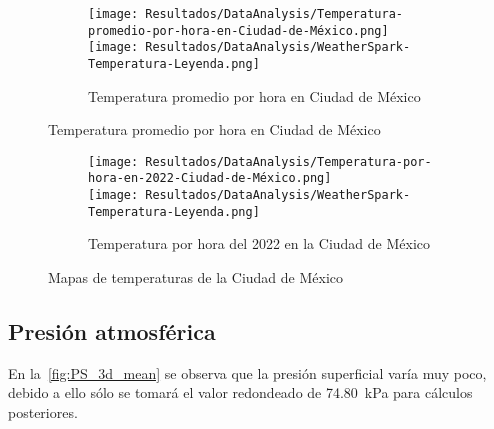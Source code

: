 			\begin{figure}[H]
				\centering
				\begin{subfigure}[t]{\linewidth}
					\centering
					\texttt{[image: Resultados/DataAnalysis/Temperatura-promedio-por-hora-en-Ciudad-de-México.png]}
					\\\texttt{[image: Resultados/DataAnalysis/WeatherSpark-Temperatura-Leyenda.png]}
					\caption{Temperatura promedio por hora en Ciudad de México}
					\label{fig:Temperatura-promedio-por-hora-en-Ciudad-de-México}
				\end{subfigure}
			\end{figure}
			\begin{figure}[H]\ContinuedFloat
				\begin{subfigure}[t]{\linewidth}
					\centering
					\texttt{[image: Resultados/DataAnalysis/Temperatura-por-hora-en-2022-Ciudad-de-México.png]}\\
					\texttt{[image: Resultados/DataAnalysis/WeatherSpark-Temperatura-Leyenda.png]}
					\caption{Temperatura por hora del 2022 en la Ciudad de México}
					\label{fig:Temperatura-por-hora-en-2022-Ciudad-de-México}
				\end{subfigure}
				\caption{Mapas de temperaturas de la Ciudad de México}
				\label{fig:Temperatura-CDMX}
			\end{figure}
		
		\subsection{Presión atmosférica}
			
			En la~\cref{fig:PS_3d_mean} se observa que la presión superficial varía muy poco, debido a ello sólo se tomará el valor redondeado de \qty{74.80}{\kilo\pascal} para cálculos posteriores.
			
